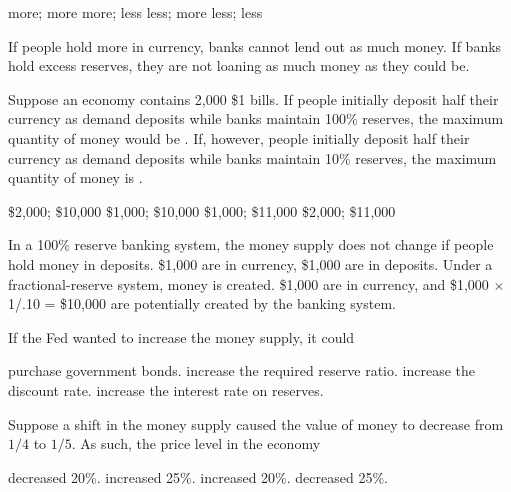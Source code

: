\documentclass[addpoints,11pt]{exam}
\theoremstyle{definition}
\newcommand{\blank}[0]{\underline{\hspace{3cm}}}
\begin{document}
\begin{questions}
	\begin{choices}
		\CorrectChoice more; more
		\choice more; less
		\choice less; more
		\choice less; less
	\end{choices}
	
	\begin{solution}
		If people hold more in currency, banks cannot lend out as much money. If banks hold excess reserves, they are not loaning as much money as they could be.
	\end{solution}

	\question Suppose an economy contains 2,000 \$1 bills. If people initially deposit half their currency as demand deposits while banks maintain 100\% reserves, the maximum quantity of money would be \blank. If, however, people initially deposit half their currency as demand deposits while banks maintain 10\% reserves, the maximum quantity of money is \blank.
	
	\begin{choices}
		\choice \$2,000; \$10,000
		\choice \$1,000; \$10,000
		\choice \$1,000; \$11,000
		\CorrectChoice \$2,000; \$11,000
	\end{choices}

	\begin{solution}
		In a 100\% reserve banking system, the money supply does not change if people hold money in deposits. \$1,000 are in currency, \$1,000 are in deposits. Under a fractional-reserve system, money is created. \$1,000 are in currency, and \$1,000 $\times$ 1/.10 = \$10,000 are potentially created by the banking system.
	\end{solution}
	
\newpage

\question If the Fed wanted to increase the money supply, it could

\begin{choices}
	\CorrectChoice purchase government bonds.
	\choice increase the required reserve ratio.
	\choice increase the discount rate.
	\choice increase the interest rate on reserves.
\end{choices}


\question Suppose a shift in the money supply caused the value of money to decrease from $1/4$ to $1/5$. As such, the price level in the economy

\begin{choices}
	\choice decreased 20\%.
	\CorrectChoice increased 25\%.
	\choice increased 20\%.
	\choice decreased 25\%.
\end{choices}


\end{questions}
\end{document}
